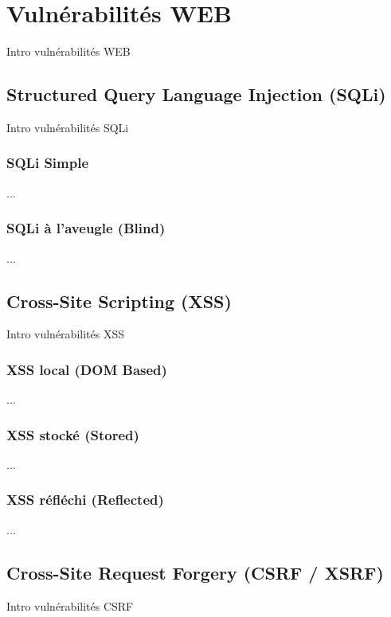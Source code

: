

\chapter{Vulnérabilités WEB}\label{vulnerabilites:web}

Intro vulnérabilités WEB

\section{Structured Query Language Injection (SQLi)}\label{vulnerabilites:web:sqli}

Intro vulnérabilités SQLi

\subsection{SQLi Simple}\label{vulnerabilites:web:sqli:simple}

...

\subsection{SQLi à l'aveugle (Blind)}\label{vulnerabilites:web:sqli:blind}

...

\section{Cross-Site Scripting (XSS)}\label{vulnerabilites:web:xss}

Intro vulnérabilités XSS

\subsection{XSS local (DOM Based)}\label{vulnerabilites:web:xss:dom}

...

\subsection{XSS stocké (Stored)}\label{vulnerabilites:web:xss:stored}

...

\subsection{XSS réfléchi (Reflected)}\label{vulnerabilites:web:xss:reflected}

...

\section{Cross-Site Request Forgery (CSRF / XSRF)}\label{vulnerabilites:web:csrf}

Intro vulnérabilités CSRF

\endinput
